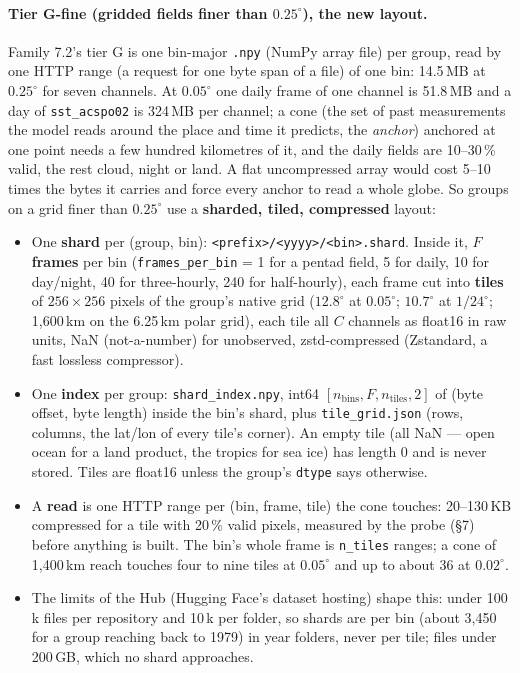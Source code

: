 \documentclass[10pt]{article}
\newcommand{\code}[1]{\texttt{#1}}
\begin{document}
\paragraph{Tier G-fine (gridded fields finer than $0.25^\circ$), the new layout.} Family 7.2's tier G is one bin-major
\code{.npy} (NumPy array file) per group, read by one HTTP range (a request for one byte span of a file) of one bin: 14.5\,MB at
$0.25^\circ$ for seven channels. At $0.05^\circ$ one daily frame of one
channel is 51.8\,MB and a day of \code{sst\_acspo02} is 324\,MB per channel;
a cone (the set of past measurements the model reads around the place and time it predicts, the \emph{anchor}) anchored at one point needs a few hundred kilometres of it, and the
daily fields are 10--30\,\% valid, the rest cloud, night or land. A flat
uncompressed array would cost 5--10 times the bytes it carries and force every
anchor to read a whole globe. So groups on a grid finer than $0.25^\circ$ use
a \textbf{sharded, tiled, compressed} layout:
\begin{itemize}\itemsep1pt\sloppy
\item One \textbf{shard} per (group, bin): \code{<prefix>/\allowbreak <yyyy>/\allowbreak <bin>.shard}.
Inside it, $F$ \textbf{frames} per bin (\code{frames\_per\_bin} = 1 for a
pentad field, 5 for daily, 10 for day/night, 40 for three-hourly, 240 for
half-hourly), each frame cut into \textbf{tiles} of $256 \times 256$ pixels
of the group's native grid ($12.8^\circ$ at $0.05^\circ$; $10.7^\circ$ at
$1/24^\circ$; 1,600\,km on the 6.25\,km polar grid), each tile all $C$
channels as float16 in raw units, NaN (not-a-number) for unobserved, zstd-compressed (Zstandard, a fast lossless compressor).
\item One \textbf{index} per group: \code{shard\_index.npy}, int64
$[n_{\mathrm{bins}}, F, n_{\mathrm{tiles}}, 2]$ of (byte offset, byte length)
inside the bin's shard, plus \code{tile\_grid.json} (rows, columns, the
lat/lon of every tile's corner). An empty tile (all NaN --- open ocean for a
land product, the tropics for sea ice) has length 0 and is never stored. Tiles are float16 unless the group's \code{dtype} says otherwise.
\item A \textbf{read} is one HTTP range per (bin, frame, tile) the cone
touches: 20--130\,KB compressed for a tile with 20\,\% valid pixels, measured
by the probe (\S7) before anything is built. The bin's whole frame is
\code{n\_tiles} ranges; a cone of 1,400\,km reach touches four to nine tiles at $0.05^\circ$ and up to about 36 at $0.02^\circ$.
\item The limits of the Hub (Hugging Face's dataset hosting) shape this: under 100\,k files per repository and
10\,k per folder, so shards are per bin (about 3,450 for a group reaching back to 1979) in year
folders, never per tile; files under 200\,GB, which no shard approaches.
\end{itemize}
\end{document}
